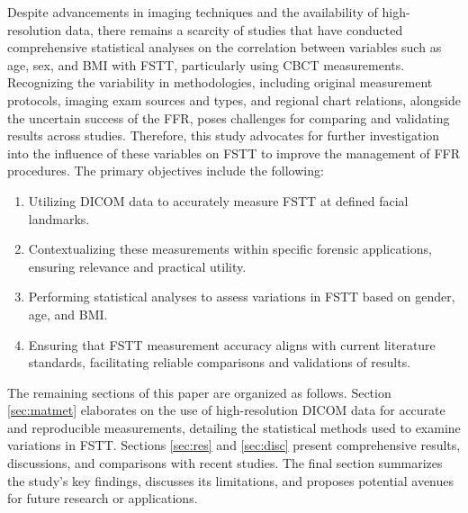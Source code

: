 \documentclass[journal,article,submit,pdftex,moreauthors]{Definitions/mdpi}
\begin{document}
Despite advancements in imaging techniques and the availability of high-resolution data, there remains a scarcity of studies that have conducted comprehensive statistical analyses on the correlation between variables such as age, sex, and BMI with FSTT, particularly using CBCT measurements. Recognizing the variability in methodologies, including original measurement protocols, imaging exam sources and types, and regional chart relations, alongside the uncertain success of the FFR, poses challenges for comparing and validating results across studies. Therefore, this study advocates for further investigation into the influence of these variables on FSTT to improve the management of FFR procedures. The primary objectives include the following:


\begin{enumerate}
    \item Utilizing DICOM data to accurately measure FSTT at defined facial landmarks.
    
    \item Contextualizing these measurements within specific forensic applications, ensuring relevance and practical utility.
    
    \item Performing statistical analyses to assess variations in FSTT based on gender, age, and BMI.
    
    \item Ensuring that FSTT measurement accuracy aligns with current literature standards, facilitating reliable comparisons and validations of results.
\end{enumerate}

The remaining sections of this paper are organized as follows. Section \ref{sec:matmet} elaborates on the use of high-resolution DICOM data for accurate and reproducible measurements, detailing the statistical methods used to examine variations in FSTT. Sections \ref{sec:res} and \ref{sec:disc} present comprehensive results, discussions, and comparisons with recent studies. The final section summarizes the study's key findings, discusses its limitations, and proposes potential avenues for future research or applications.
\end{document}
